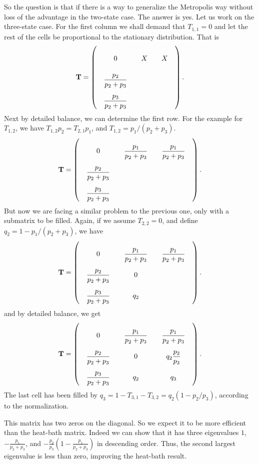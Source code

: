 \documentclass[12pt]{article}
\begin{document}
So the question is that if there is a way to generalize
the Metropolis way without loss of the advantage in the two-state case.
%
The answer is yes.
%
Let us work on the three-state case.
%
For the first column we shall demand that $T_{1,1} = 0$
and let the rest of the cells be proportional to
the stationary distribution. That is
$$
\mathbf T =
\left(
  \arraycolsep=10.0pt\def\arraystretch{2.5}
  \begin{array}{cccccc}
    0   &  X & X \\
    \dfrac{p_2}{p_2+p_3} &  & \\
    \dfrac{p_3}{p_2+p_3} &  &
  \end{array}
\right).
$$
Next by detailed balance, we can determine the first row.
For the example for $T_{1,2}$,
we have $T_{1,2} p_2 = T_{2,1} p_1$,
and $T_{1,2} = p_1/(p_2 + p_3)$.
$$
\mathbf T =
\left(
  \arraycolsep=10.0pt\def\arraystretch{2.5}
  \begin{array}{cccccc}
    0   &  \dfrac{p_1}{p_2+p_3} & \dfrac{p_1}{p_2+p_3} \\
    \dfrac{p_2}{p_2+p_3} &  & \\
    \dfrac{p_3}{p_2+p_3} &  &
  \end{array}
\right).
$$
But now we are facing a similar problem to the previous one,
only with a submatrix to be filled.
Again, if we assume $T_{2,2} = 0$, and define $q_2 = 1- p_1/(p_2 + p_3)$,
we have
$$
\mathbf T =
\left(
  \arraycolsep=10.0pt\def\arraystretch{2.5}
  \begin{array}{cccccc}
    0   &  \dfrac{p_1}{p_2+p_3} & \dfrac{p_1}{p_2+p_3} \\
    \dfrac{p_2}{p_2+p_3} &  0 & \\
    \dfrac{p_3}{p_2+p_3} &  q_2 &
  \end{array}
\right).
$$
and by detailed balance, we get
$$
\mathbf T =
\left(
  \arraycolsep=10.0pt\def\arraystretch{2.5}
  \begin{array}{cccccc}
    0   &  \dfrac{p_1}{p_2+p_3} & \dfrac{p_1}{p_2+p_3} \\
    \dfrac{p_2}{p_2+p_3} &  0 & q_2 \dfrac{p_2}{p_3} \\
    \dfrac{p_3}{p_2+p_3} &  q_2 & q_3
  \end{array}
\right).
$$
The last cell has been filled by $q_3 = 1 - T_{3,1} - T_{3,2} = q_2 (1 - p_2/p_3)$,
according to the normalization.

This matrix has two zeros on the diagonal.
So we expect it to be more efficient than the heat-bath matrix.
Indeed we can show that it has three eigenvalues
$1$, $-\frac{p_1}{p_2+p_3}$, and $-\frac{p_2}{p_3}\left( 1 - \frac{p_1}{p_2+p_3} \right)$
in descending order.
Thus, the second largest eigenvalue is less than zero,
improving the heat-bath result.
\end{document}
